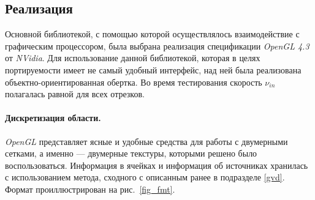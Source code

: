 \documentclass[12pt]{article}
\begin{document}
\subsection{Реализация}
Основной библиотекой, с помощью которой осуществлялось взаимодействие с графическим
процессором, была выбрана реализация спецификации \emph{OpenGL 4.3} от 
\emph{NVidia\textregistered}. Для использование данной библиотекой, 
которая в целях портируемости имеет не самый удобный интерфейс,
над ней была реализована объектно-ориентированная обертка. 
Во время тестирования скорость $\nu_{in}$ полагалась равной для всех отрезков.

\paragraph{Дискретизация области.} \emph{OpenGL} представляет ясные и 
удобные средства для работы с двумерными сетками, а именно --- двумерные
текстуры, которыми решено было воспользоваться. Информация в ячейках и информация
об источниках хранилась с использованием метода, сходного с описанным ранее 
в подразделе \ref{gvd}. Формат проиллюстрирован на рис.~\ref{fig_fmt}.
\end{document}
